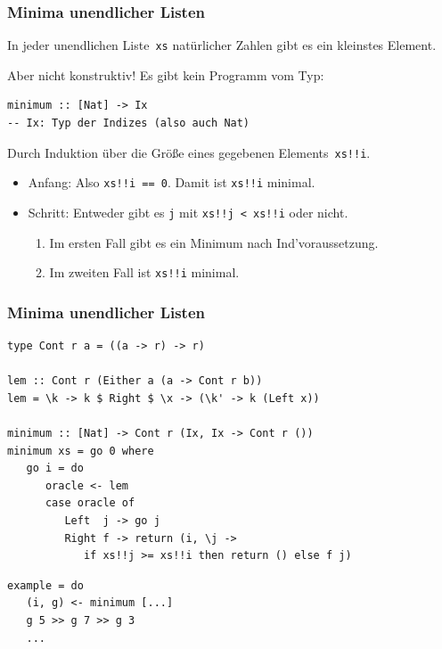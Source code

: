 \documentclass[12pt,utf8,notheorems,compress,t]{beamer}
\renewcommand{\_}{\mathpunct{.}}
\newcommand{\?}{\,{:}\,}
\newcommand{\hil}[1]{{\usebeamercolor[fg]{item}{\textbf{#1}}}}
\begin{document}
\begin{frame}[fragile]\frametitle{Minima unendlicher Listen}
  \hil{Satz.} In jeder unendlichen Liste~\texttt{xs} natürlicher Zahlen gibt es
  ein kleinstes Element.

  Aber nicht konstruktiv! Es gibt kein Programm vom Typ:
  \begin{center}
    \begin{minipage}{0.7\textwidth}
      \begin{verbatim}
minimum :: [Nat] -> Ix
-- Ix: Typ der Indizes (also auch Nat)
      \end{verbatim}
    \end{minipage}
  \end{center}

  \pause
  \hil{Beweis.} Durch Induktion über die Größe eines gegebenen
  Elements~\texttt{xs!!i}.
  \begin{itemize}
    \item Anfang: Also \texttt{xs!!i == 0}. Damit ist \texttt{xs!!i}
    minimal.
    \item Schritt: Entweder gibt es \texttt{j} mit \texttt{xs!!j < xs!!i} oder nicht.
    \begin{enumerate}
      \item Im ersten Fall gibt es ein Minimum nach Ind'voraussetzung.
      \item Im zweiten Fall ist \texttt{xs!!i} minimal.
    \end{enumerate}
  \end{itemize}
\end{frame}

\begin{frame}[fragile]\frametitle{Minima unendlicher Listen}
  \begin{verbatim}
type Cont r a = ((a -> r) -> r)

lem :: Cont r (Either a (a -> Cont r b))
lem = \k -> k $ Right $ \x -> (\k' -> k (Left x))

minimum :: [Nat] -> Cont r (Ix, Ix -> Cont r ())
minimum xs = go 0 where
   go i = do
      oracle <- lem
      case oracle of
         Left  j -> go j
         Right f -> return (i, \j ->
            if xs!!j >= xs!!i then return () else f j)
  \end{verbatim}
  \pause
  \begin{verbatim}
example = do
   (i, g) <- minimum [...]
   g 5 >> g 7 >> g 3
   ...
  \end{verbatim}
\end{frame}
\end{document}
